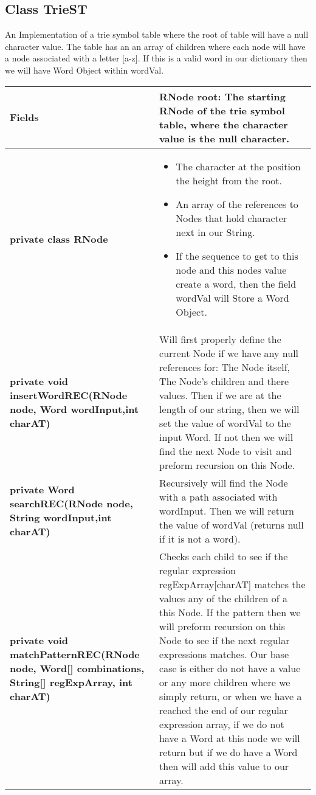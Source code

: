 \documentclass[11pt]{article}
\begin{document}
\subsection{Class TrieST}

An Implementation of a trie symbol table where the root of table will have a null character value. The table has an an array of children where each node will have a node associated with a letter  [a-z]. If this is a valid word in our dictionary then we will have Word Object within wordVal.\\
\begin{tabular}{|p{}|p{}|}
\hline
\textbf{Fields} & RNode root: The starting RNode of the trie symbol table, where the character value is the null character.\\
\hline
\textbf{private class RNode} &
\begin{itemize}
	\item The character at the position the height from the root.
	\item An array of the references to Nodes that hold character next in our String.
	\item If the sequence to get to this node and this nodes value create a word, then the field wordVal will Store a Word Object.
\end{itemize} \\
\hline
\textbf{private void insertWordREC(RNode node, Word wordInput,int charAT)} & Will first properly define the current Node if we have any null references for: The Node itself, The Node's children and there values. Then if we are at the length of our string, then we will set the value of wordVal to the input Word. If not then we will find the next Node to visit and preform recursion on this Node.\\
\hline
\textbf{private Word searchREC(RNode node, String wordInput,int charAT)} & Recursively will find the Node with a path associated with wordInput. Then we will return the value of wordVal (returns null if it is not a word).\\
\hline
\textbf{private void matchPatternREC(RNode node, Word[] combinations, String[] regExpArray, int charAT)} & Checks each child to see if the regular expression regExpArray[charAT] matches the values any of the children of a this Node. If the pattern then we will preform recursion on this Node to see if the next regular expressions matches. Our base case is either do not have a value or any more children where we simply return, or when we have a reached the end of our regular expression array, if we do not have a Word at this node we will return but if we do have a Word then will add this value to our array.\\
\hline
\end{tabular}
\end{document}
